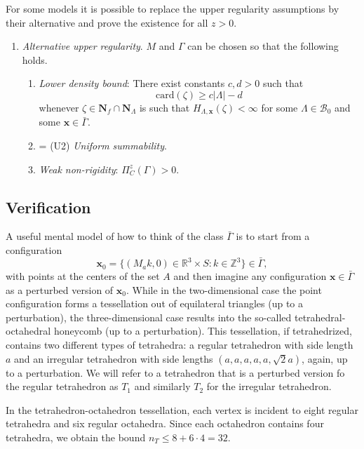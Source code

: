 \documentclass{kybernetika}
\newcommand{\Rt}{{\mathbb R^3}}
\newcommand{\x}{{\mathbf{x}}}
\begin{document}
For some models it is possible to replace the upper regularity assumptions by their alternative and prove the existence for all $z>0$.

\begin{enumerate}[(\textbf{\^{U}})]
	\item \textit{Alternative upper regularity}. $M$ and $\Gamma$ can be chosen so that the following holds.
	\begin{enumerate}[(\^U1)]
		\item \textit{Lower density bound}: There exist constants $c,d > 0$ such that 
			$$\mathrm{card}(\zeta) \geq c|\Lambda| - d$$
			whenever $\zeta \in \mathbf N_f\cap\mathbf  N_\Lambda$ is such that $H_{\Lambda,\x}(\zeta)<\infty$ for some $\Lambda \in \mathcal B_0$ and some $\x \in \bar\Gamma$.
		\item = (U2) \textit{Uniform summability}.
		\item \textit{Weak non-rigidity}: $\Pi^z_C(\Gamma) > 0$.
	\end{enumerate}
\end{enumerate}


\subsection{Verification}
A useful mental model of how to think of the class $\bar \Gamma$ is to start from a configuration 
$$\x_0 = \{(M_ak,0) \in \Rt\times S: k \in \mathbb Z^3\} \in \bar\Gamma,$$ 
with points at the centers of the set $A$ and then imagine any configuration $\x \in \bar \Gamma$ as a perturbed version of $\x_0$.
While in the two-dimensional case the point configuration forms a tessellation out of equilateral triangles (up to a perturbation), the three-dimensional case results into the so-called tetrahedral-octahedral honeycomb (up to a perturbation). 
This tessellation, if tetrahedrized, contains two different types of tetrahedra: a regular tetrahedron with side length $a$ and an irregular tetrahedron with side lengths $(a,a,a,a,a,\sqrt 2a)$, again, up to a perturbation. We will refer to a tetrahedron that is a perturbed version fo the regular tetrahedron as $T_1$ and similarly $T_2$ for the irregular tetrahedron. 

In the tetrahedron-octahedron tessellation, each  vertex is incident to eight regular tetrahedra and six regular octahedra. 
Since each octahedron contains four tetrahedra, we obtain the bound $n_T\leq 8+6\cdot 4 = 32$.
\end{document}

